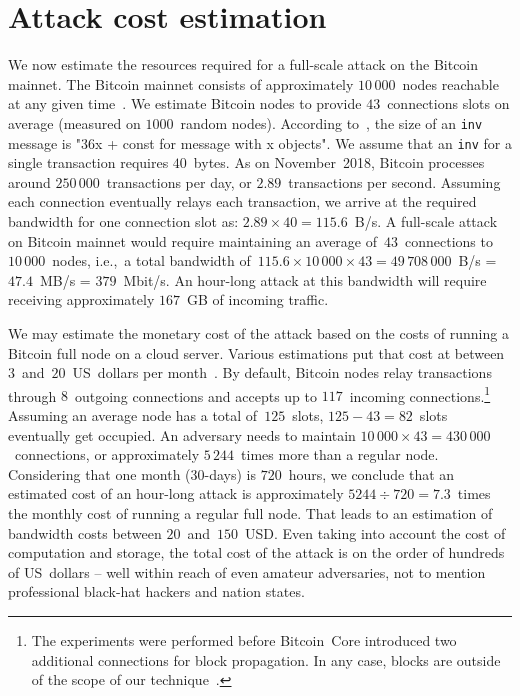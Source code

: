 \section{Attack cost estimation}

We now estimate the resources required for a full-scale attack on the Bitcoin mainnet.
The Bitcoin mainnet consists of approximately $10\,000$~nodes reachable at any given time~\cite{Bitnodes}.
We estimate Bitcoin nodes to provide $43$~connections slots on average (measured on $1000$~random nodes).
According to~\cite{BitcoinWiki}, the size of an \texttt{inv} message is "36x + const for message with x objects".
We assume that an \texttt{inv} for a single transaction requires $40$~bytes.
As on November~2018, Bitcoin processes around $250\,000$~transactions per day, or $2.89$~transactions per second.
Assuming each connection eventually relays each transaction, we arrive at the required bandwidth for one connection slot as: $2.89 \times 40 = 115.6$~B/s.
A full-scale attack on Bitcoin mainnet would require maintaining an average of~$43$~connections to $10\,000$~nodes, i.e.,~a total bandwidth of~$115.6 \times 10\,000 \times 43 = 49\,708\,000$~B/s = $47.4$~MB/s = $379$~Mbit/s.
An hour-long attack at this bandwidth will require receiving approximately $167$~GB of incoming traffic.

We may estimate the monetary cost of the attack based on the costs of running a Bitcoin full node on a cloud server.
Various estimations put that cost at between $3$~and~$20$~US~dollars per month~\cite{Zeyde2018, Connell2017}.
By default, Bitcoin nodes relay transactions through $8$~outgoing connections and accepts up to $117$~incoming connections.\footnote{The experiments were performed before Bitcoin~Core introduced two additional connections for block propagation. In any case, blocks are outside of the scope of our technique~\cite{Daftuar2019}.}
Assuming an average node has a total of~$125$~slots, $125 - 43 = 82$~slots eventually get occupied.
An adversary needs to maintain $10\,000 \times 43 = 430\,000$~connections, or approximately $5\,244$~times more than a regular node.
Considering that one month ($30$-days) is $720$~hours, we conclude that an estimated cost of an hour-long attack is approximately $5244 \div 720 = 7.3$~times the monthly cost of running a regular full node.
That leads to an estimation of bandwidth costs between $20$~and~$150$~USD\@.
Even taking into account the cost of computation and storage, the total cost of the attack is on the order of hundreds of US~dollars -- well within reach of even amateur adversaries, not to mention professional black-hat hackers and nation states.

